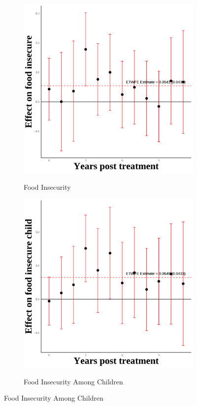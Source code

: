 \documentclass[12pt,english]{article}
\begin{document}
\begin{figure}[H]
  \begin{subfigure}[b]{0.3\textwidth}
    \centering
    \caption{Food Insecurity}
    \includegraphics[width=\linewidth]{figures/plot95-food_insecure_event_study-fourth.png}
    \label{fig:food-insecure-fourth}
  \end{subfigure}
  \hfill
  \begin{subfigure}[b]{0.3\textwidth}
    \centering
    \caption{Food Insecurity Among Children}
    \includegraphics[width=\linewidth]{figures/plot96-food_insecure_child_event_study-fourth.png}
    \label{fig:food-insecure-child-fourth}
  \end{subfigure}

\end{figure}
\end{document}
